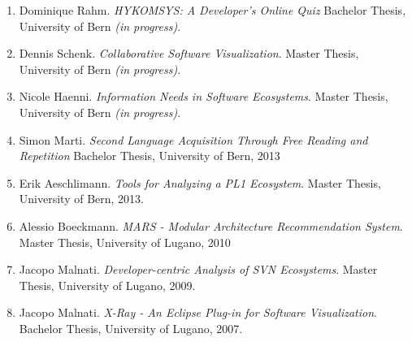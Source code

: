 
\begin{enumerate}

\item Dominique Rahm. \emph{HYKOMSYS: A Developer's Online Quiz} Bachelor Thesis, University of Bern \emph{(in progress)}.

\item Dennis Schenk. \emph{Collaborative Software Visualization}. Master Thesis, University of Bern \emph{(in progress)}.

\item Nicole Haenni. \emph {Information Needs in Software Ecosystems}. Master Thesis, University of Bern \emph{(in progress)}.

\item Simon Marti. \emph{Second Language Acquisition Through Free Reading and Repetition} Bachelor Thesis, University of Bern, 2013

\item Erik Aeschlimann. \emph {Tools for Analyzing a PL1 Ecosystem}. Master Thesis, University of Bern, 2013.

\item Alessio Boeckmann. \emph{MARS - Modular Architecture Recommendation System}. Master Thesis, University of Lugano, 2010

\item Jacopo Malnati. \emph{Developer-centric Analysis of SVN Ecosystems}. Master Thesis, University of Lugano, 2009.

\item Jacopo Malnati. \emph{X-Ray - An Eclipse Plug-in for Software Visualization}. Bachelor Thesis, University of Lugano, 2007.

\end{enumerate}